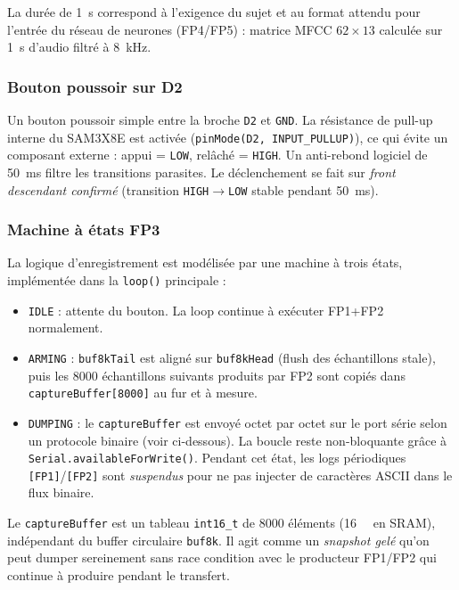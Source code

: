 La durée de \SI{1}{\second} correspond à l'exigence du sujet et au format attendu pour l'entrée du réseau de neurones (FP4/FP5) : matrice MFCC $62 \times 13$ calculée sur 1~\si{\second} d'audio filtré à \SI{8}{\kilo\hertz}.

\subsubsection{Bouton poussoir sur D2}

Un bouton poussoir simple entre la broche \texttt{D2} et \texttt{GND}. La résistance de pull-up interne du SAM3X8E est activée (\verb|pinMode(D2, INPUT_PULLUP)|), ce qui évite un composant externe : appui = \texttt{LOW}, relâché = \texttt{HIGH}. Un anti-rebond logiciel de \SI{50}{\milli\second} filtre les transitions parasites. Le déclenchement se fait sur \emph{front descendant confirmé} (transition \texttt{HIGH}$\rightarrow$\texttt{LOW} stable pendant \SI{50}{\milli\second}).

\subsubsection{Machine à états FP3}

La logique d'enregistrement est modélisée par une machine à trois états, implémentée dans la \verb|loop()| principale :

\begin{itemize}
    \item \texttt{IDLE} : attente du bouton. La loop continue à exécuter FP1+FP2 normalement.
    \item \texttt{ARMING} : \texttt{buf8kTail} est aligné sur \texttt{buf8kHead} (flush des échantillons stale), puis les \num{8000} échantillons suivants produits par FP2 sont copiés dans \texttt{captureBuffer[8000]} au fur et à mesure.
    \item \texttt{DUMPING} : le \texttt{captureBuffer} est envoyé octet par octet sur le port série selon un protocole binaire (voir ci-dessous). La boucle reste non-bloquante grâce à \verb|Serial.availableForWrite()|. Pendant cet état, les logs périodiques \texttt{[FP1]}/\texttt{[FP2]} sont \emph{suspendus} pour ne pas injecter de caractères ASCII dans le flux binaire.
\end{itemize}

Le \texttt{captureBuffer} est un tableau \texttt{int16\_t} de \num{8000} éléments (\SI{16}{\kibi\byte} en SRAM), indépendant du buffer circulaire \texttt{buf8k}. Il agit comme un \emph{snapshot gelé} qu'on peut dumper sereinement sans race condition avec le producteur FP1/FP2 qui continue à produire pendant le transfert.

